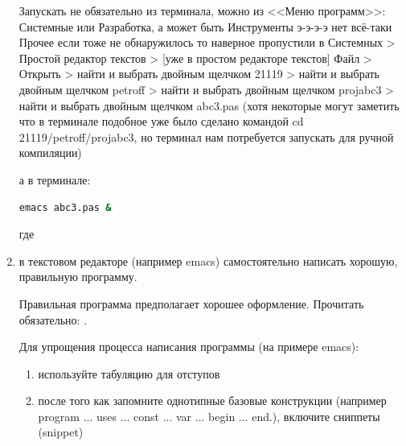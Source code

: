 \documentclass[unicode, 12pt, a4paper,oneside,fleqn]{article}
\begin{document}
\begin{enumerate}
  Запускать не обязательно из терминала, можно из <<Меню программ>>:
  Системные или Разработка, а может быть Инструменты э-э-э-э нет
  всё-таки Прочее если тоже не обнаружилось то наверное пропустили в
  Системных > Простой редактор текстов > [уже в простом редакторе
  текстов] Файл > Открыть > найти и выбрать двойным щелчком 21119 >
  найти и выбрать двойным щелчком petroff > найти и выбрать двойным
  щелчком projabc3 > найти и выбрать двойным щелчком abc3.pas (хотя
  некоторые могут заметить что в терминале подобное уже было сделано
  командой cd 21119/petroff/projabc3, но терминал нам потребуется
  запускать для ручной компиляции)
  
  
  а в терминале:

\begin{lstlisting}[language=bash]
emacs abc3.pas &
\end{lstlisting}

  где 

\item в текстовом редакторе (например emacs) самостоятельно написать
  хорошую, правильную программу.

  Правильная программа предполагает хорошее оформление. Прочитать
  обязательно: \cite[Жиганов Е.Д.]{zed.coding.rules}.
  
  Для упрощения процесса написания программы (на примере emacs):
  \begin{enumerate}
  \item используйте табуляцию для отступов
  \item после того как запомните однотипные базовые конструкции
    (например program ... uses ... const ... var ... begin ... end.),
    включите сниппеты (snippet)
    

\end{enumerate}
\end{enumerate}
\end{document}
